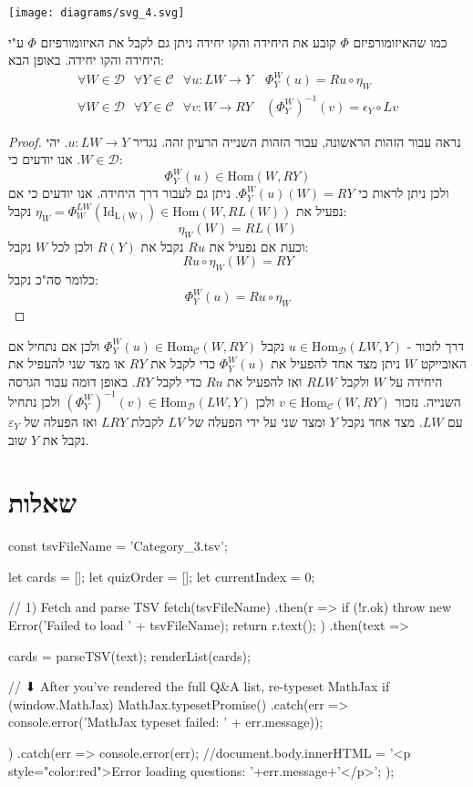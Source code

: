 \documentclass{tstextbook}
\begin{document}
\texttt{[image: diagrams/svg\_4.svg]}
\begin{proposition}
כמו שהאיזומורפיזם \(\Phi\) קובע את היחידה והקו יחידה ניתן גם לקבל את האיזומורפיזם \(\Phi\) ע"י היחידה והקו יחידה. באופן הבא:
\begin{gather*}{{\forall W\in \mathcal{D} \,\;\;\forall Y\in \mathcal{C} \,\;\;\forall u:L W\rightarrow Y\quad\Phi_{Y}^{W}(u)=R u\circ\eta_{W}}}\\ {{\forall W\in \mathcal{D} \,\;\;\forall Y\in \mathcal{C} \,\;\;\forall v:W\rightarrow R Y\quad\left(\Phi_{Y}^{W}\right)^{-1}(v)=\epsilon_{Y}\circ L v}}\end{gather*}

\end{proposition}
\begin{proof}
נראה עבור הזהות הראשונה, עבור הזהות השנייה הרעיון זהה. נגדיר \(u:LW\to Y\). יהי \(W \in \mathcal{D}\). אנו יודעים כי:
$$\Phi_{Y}^{W}(u)\in \mathrm{Hom}(W,RY)$$
ולכן ניתן לראות כי \(\Phi^{W}_{Y}(u)(W)=RY\). ניתן גם לעבור דרך היחידה. אנו יודעים כי אם נפעיל את \(\eta_{W}=\Phi_{W}^{LW}\left( \mathrm{Id_{L(W)}} \right)\in\mathrm{Hom}(W,RL(W))\) נקבל:
$$\eta_{W}(W)=RL(W)$$
וכעת אם נפעיל את \(Ru\) נקבל את \(R(Y)\) ולכן לכל \(W\) נקבל:
$$Ru\circ \eta_{W}(W)=RY$$
כלומר סה"כ נקבל:
$$\Phi_{Y}^{W}(u)=Ru\circ  \eta_{W}$$

\end{proof}
\begin{remark}
דרך לזכור - \(u \in \mathrm{Hom}_{\mathcal{D}}(LW,Y)\) נקבל \(\Phi_{Y}^{W}(u)\in \mathrm{Hom}_{\mathcal{C}}(W,RY)\) ולכן אם נתחיל אם האובייקט \(W\) ניתן מצד אחד להפעיל את \(\Phi_{Y}^{W}(u)\) כדי לקבל את \(RY\) או מצד שני להעפיל את היחידה על \(W\) ולקבל \(RLW\) ואז להפעיל את \(Ru\) כדי לקבל \(RY\). באופן דומה עבור הגרסה השנייה. נזכור \(v \in \mathrm{Hom}_{\mathcal{C}}(W,RY)\) ולכן \(\left( \Phi^{W}_{Y} \right)^{-1}(v)\in\mathrm{Hom}_{\mathcal{D}}(LW,Y)\) ולכן נתחיל עם \(LW\). מצד אחד נקבל \(Y\) ומצד שני על ידי הפעלה של \(LV\) לקבלת \(LRY\) ואז הפעלה של \(\varepsilon_{Y}\) נקבל את \(Y\) שוב.

\end{remark}
\section{שאלות}


    const tsvFileName = 'Category_3.tsv';

    let cards = [];
    let quizOrder = [];
    let currentIndex = 0;

    // 1) Fetch and parse TSV
fetch(tsvFileName)
  .then(r => {
    if (!r.ok) throw new Error('Failed to load ' + tsvFileName);
    return r.text();
  })
  .then(text => {
    cards = parseTSV(text);
    renderList(cards);

    // ⬇ After you’ve rendered the full Q&A list, re-typeset MathJax
    if (window.MathJax) {
      MathJax.typesetPromise()
        .catch(err => console.error('MathJax typeset failed: ' + err.message));
    }
  })
  .catch(err => {
    console.error(err);
    //document.body.innerHTML =  '<p style="color:red">Error loading questions: '+err.message+'</p>';
  });
\end{document}
